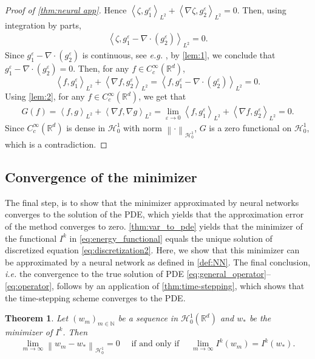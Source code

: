 \documentclass[11pt,a4paper,reqno]{amsart}
\numberwithin{equation}{section}
\theoremstyle{plain}
\newtheorem{theorem}{Theorem}[section]
\theoremstyle{definition}
\def\e{{\varepsilon}}
\newcommand{\ip}[1]{\left\langle#1\right\rangle}
\newcommand{\R}{\mathbb{R}}
\newcommand{\norm}[1]{\left\|#1 \right\|} %
\begin{document}
\begin{proof}[Proof of \cref{thm:neural app}]
Hence $\ip{\zeta, g^\e_1}_{L^2} + \ip{\nabla \zeta, g^\e_2}_{L^2} = 0$.
Then, using integration by parts,
\begin{align*}
 \ip{\zeta, g^\e_1 - \nabla \cdot \left( g^\e_2 \right)}_{L^2} = 0.
\end{align*}
Since $g^\e_1 - \nabla \cdot \left( g^\e_2 \right)$ is continuous, see \textit{e.g.} \citet[Proposition 11.1]{Jan}, by \cref{lem:1}, we conclude that $g^\e_1 - \nabla \cdot \left( g^\e_2 \right) = 0$. 
Then, for any $f \in C^\infty_c (\R^d)$, 
\[
 \ip{f, g^\e_1}_{L^2} + \ip{\nabla f, g^\e_2}_{L^2} = \ip{f, g^\e_1 - \nabla \cdot \left( g^\e_2 \right)}_{L^2} = 0. 
\]
Using \cref{lem:2}, for any $f \in C^\infty_c (\R^d)$, we get that
\begin{align*}
 G \left( f \right) = \ip{f, g}_{L^2} + \ip{\nabla f, \nabla g}_{L^2} = \lim_{\e \to 0} \ip{f, g^\e_1}_{L^2} + \ip{\nabla f, g^\e_2}_{L^2} = 0.
\end{align*}
Since $C^\infty_c (\R^d)$ is dense in $\mathcal H_0^1$ with norm $\norm{\cdot}_{\mathcal{H}_0^1}$, $G$ is a zero functional on $\mathcal{H}_0^1$, which is a contradiction.
\end{proof}


\subsection{Convergence of the minimizer}
\label{sec:convergence}

The final step, is to show that the minimizer approximated by neural networks converges to the solution of the PDE, which yields that the approximation error of the method converges to zero.
\cref{thm:var_to_pde} yields that the minimizer of the functional $I^k$ in \eqref{eq:energy_functional} equals the unique solution of discretized equation \eqref{eq:discretization2}.
Here, we show that this minimizer can be approximated by a neural network as defined in \cref{def:NN}.
The final conclusion, \emph{i.e.} the convergence to the true solution of PDE \eqref{eq:general_operator}--\eqref{eq:operator}, follows by an application of \cref{thm:time-stepping}, which shows that the time-stepping scheme converges to the PDE.

\begin{theorem}
\label{thm:5}
Let $(w_m)_{m\in\mathbb N}$ be a sequence in $\mathcal{H}_0^1 (\R^d)$ and $w_*$ be the minimizer of $I^k$. Then 
\[
    \lim_{m \to \infty}\norm{w_m - w_*}_{\mathcal{H}^1_0} = 0 
        \quad \text{ if and only if } \quad 
    \lim_{m \to \infty} I^k \left( w_m \right) = I^k \left( w_* \right).
\]
\end{theorem}
\end{document}

